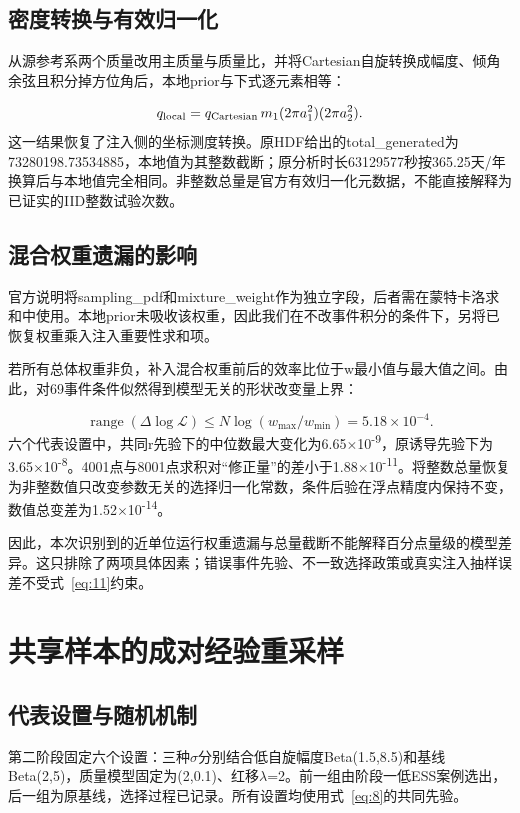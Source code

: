 \documentclass[UTF8,a4paper,11pt,fontset=fandol]{ctexart}
\begin{document}
\subsection{密度转换与有效归一化}\label{sec:5.2}
从源参考系两个质量改用主质量与质量比，并将Cartesian自旋转换成幅度、倾角余弦且积分掉方位角后，本地prior与下式逐元素相等：

\begin{equation}\label{eq:10}
q_{\rm local}=q_{\rm Cartesian}\,m_1(2\pi a_1^2)(2\pi a_2^2).
\end{equation}
这一结果恢复了注入侧的坐标测度转换。原HDF给出的total\_generated为73280198.73534885，本地值为其整数截断；原分析时长63129577秒按365.25天/年换算后与本地值完全相同。非整数总量是官方有效归一化元数据，不能直接解释为已证实的IID整数试验次数。

\subsection{混合权重遗漏的影响}\label{sec:5.3}
官方说明将sampling\_pdf和mixture\_weight作为独立字段，后者需在蒙特卡洛求和中使用\cite{ref8,ref9}。本地prior未吸收该权重，因此我们在不改事件积分的条件下，另将已恢复权重乘入注入重要性求和项。

若所有总体权重非负，补入混合权重前后的效率比位于w最小值与最大值之间。由此，对69事件条件似然得到模型无关的形状改变量上界：

\begin{equation}\label{eq:11}
\operatorname{range}(\Delta\log\mathcal L)\leq N\log(w_{\max}/w_{\min})=5.18\times10^{-4}.
\end{equation}
六个代表设置中，共同r先验下的中位数最大变化为6.65\(\times\)10\textsuperscript{-9}，原诱导先验下为3.65\(\times\)10\textsuperscript{-8}。4001点与8001点求积对“修正量”的差小于1.88\(\times\)10\textsuperscript{-11}。将整数总量恢复为非整数值只改变参数无关的选择归一化常数，条件后验在浮点精度内保持不变，数值总变差为1.52\(\times\)10\textsuperscript{-14}。

因此，本次识别到的近单位运行权重遗漏与总量截断不能解释百分点量级的模型差异。这只排除了两项具体因素；错误事件先验、不一致选择政策或真实注入抽样误差不受式~\eqref{eq:11}约束。

\FloatBarrier
\section{共享样本的成对经验重采样}\label{sec:6}
\subsection{代表设置与随机机制}\label{sec:6.1}
第二阶段固定六个设置：三种\(\sigma\)分别结合低自旋幅度Beta(1.5,8.5)和基线Beta(2,5)，质量模型固定为(2,0.1)、红移\(\lambda\)=2。前一组由阶段一低ESS案例选出，后一组为原基线，选择过程已记录。所有设置均使用式~\eqref{eq:8}的共同先验。
\end{document}
